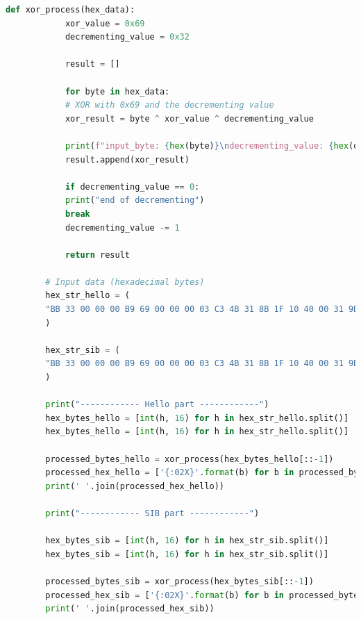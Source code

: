 \documentclass{article}
\begin{document}
	\begin{lstlisting}[language=Python]
		def xor_process(hex_data):
			xor_value = 0x69
			decrementing_value = 0x32
			
			result = []
			
			for byte in hex_data:
			# XOR with 0x69 and the decrementing value
			xor_result = byte ^ xor_value ^ decrementing_value
			
			print(f"input_byte: {hex(byte)}\ndecrementing_value: {hex(decrementing_value)}\nxor_result{hex(xor_result)}\tascii: {chr(xor_result)}\n")
			result.append(xor_result)
			
			if decrementing_value == 0:
			print("end of decrementing")
			break
			decrementing_value -= 1
			
			return result
		
		# Input data (hexadecimal bytes)
		hex_str_hello = (
		"BB 33 00 00 00 B9 69 00 00 00 03 C3 4B 31 8B 1F 10 40 00 31 9B 1F 10 40 00 85 DB 75 EF EB 0C 21 68 0E 6A 01 6C 03 6E 0E 60 63 62 0F 64 0F 79 69 38 7B 12 62 6C 3F 7E 1B 70 9B 7C 75 75 77 1C 49 A0 4A 4A 4D 4C 83 B1 64 40 63 02 45 BB 62 4E 79 18 5B"
		)
		
		hex_str_sib = (
		"BB 33 00 00 00 B9 69 00 00 00 03 C3 4B 31 8B 1F 10 40 00 31 9B 1F 10 40 00 85 DB 75 EF EB 0C 3a 68 22 6A 2F 6C 5D 6E 53 60 63 62 0F 64 0F 79 69 38 7B 12 62 6C 3F 7E 1B 70 9B 7C 75 75 77 1C 49 A0 4A 4A 4D 4C 83 B1 64 40 63 02 45 BB 62 4E 79 18 5B"
		)
		
		print("------------ Hello part ------------")
		hex_bytes_hello = [int(h, 16) for h in hex_str_hello.split()]
		hex_bytes_hello = [int(h, 16) for h in hex_str_hello.split()]
		
		processed_bytes_hello = xor_process(hex_bytes_hello[::-1])
		processed_hex_hello = ['{:02X}'.format(b) for b in processed_bytes_hello]
		print(' '.join(processed_hex_hello))
		
		print("------------ SIB part ------------")
		
		hex_bytes_sib = [int(h, 16) for h in hex_str_sib.split()]
		hex_bytes_sib = [int(h, 16) for h in hex_str_sib.split()]
		
		processed_bytes_sib = xor_process(hex_bytes_sib[::-1])
		processed_hex_sib = ['{:02X}'.format(b) for b in processed_bytes_sib]
		print(' '.join(processed_hex_sib))
	\end{lstlisting}
	
	\pagebreak
	
\end{document}
